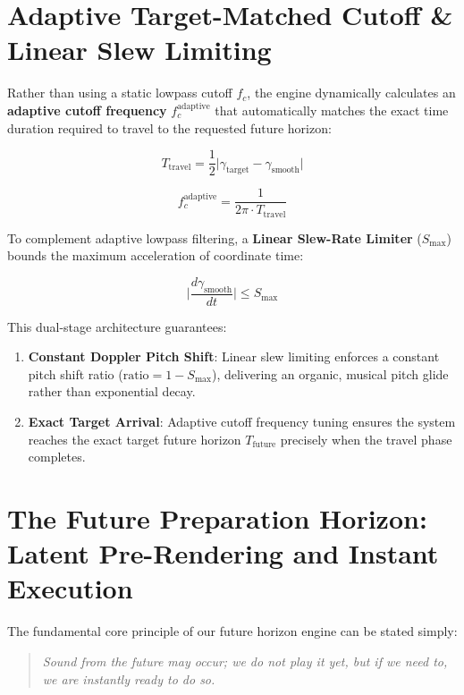 \documentclass[11pt,a4paper]{article}
\begin{document}
\section{Adaptive Target-Matched Cutoff \& Linear Slew Limiting}

Rather than using a static lowpass cutoff $f_c$, the engine dynamically calculates an \textbf{adaptive cutoff frequency} $f_c^{\text{adaptive}}$ that automatically matches the exact time duration required to travel to the requested future horizon:

\begin{equation}
T_{\text{travel}} = \frac{1}{2} \Big| \gamma_{\text{target}} - \gamma_{\text{smooth}} \Big|
\end{equation}

\begin{equation}
f_c^{\text{adaptive}} = \frac{1}{2\pi \cdot T_{\text{travel}}}
\end{equation}

To complement adaptive lowpass filtering, a \textbf{Linear Slew-Rate Limiter} ($S_{\text{max}}$) bounds the maximum acceleration of coordinate time:

\begin{equation}
\Big| \frac{d\gamma_{\text{smooth}}}{dt} \Big| \le S_{\text{max}}
\end{equation}

This dual-stage architecture guarantees:
\begin{enumerate}
\item \textbf{Constant Doppler Pitch Shift}: Linear slew limiting enforces a constant pitch shift ratio ($\text{ratio} = 1 - S_{\text{max}}$), delivering an organic, musical pitch glide rather than exponential decay.
\item \textbf{Exact Target Arrival}: Adaptive cutoff frequency tuning ensures the system reaches the exact target future horizon $T_{\text{future}}$ precisely when the travel phase completes.
\end{enumerate}

\section{The Future Preparation Horizon: Latent Pre-Rendering and Instant Execution}

The fundamental core principle of our future horizon engine can be stated simply:
\begin{quote}
\textit{Sound from the future may occur; we do not play it yet, but if we need to, we are instantly ready to do so.}
\end{quote}
\end{document}
